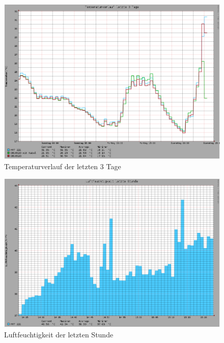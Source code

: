 \begin{figure}[!h] 
  \centering
     \includegraphics[scale=.3]{BilderAllgemein/Bilder/Temperatur3Tage.png}
  \caption{Temperaturverlauf der letzten 3 Tage}
\end{figure}

\begin{figure}[!h] 
  \centering
     \includegraphics[scale=.3]{BilderAllgemein/Bilder/FeuchtigkeitStunde.png}
  \caption{Luftfeuchtigkeit der letzten Stunde}
\end{figure}

